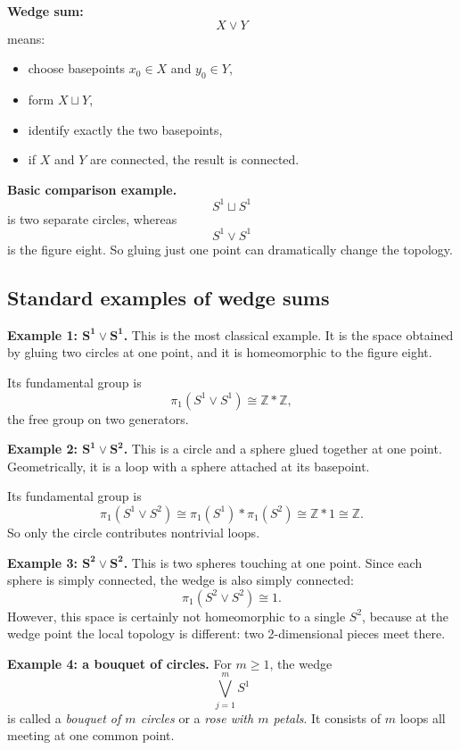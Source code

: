 \documentclass[12pt,a4paper]{article}
\theoremstyle{notespace}
\begin{document}
\medskip

\textbf{Wedge sum:}
\[
X\vee Y
\]
means:
\begin{itemize}
	\item choose basepoints \(x_0\in X\) and \(y_0\in Y\),
	\item form \(X\sqcup Y\),
	\item identify exactly the two basepoints,
	\item if \(X\) and \(Y\) are connected, the result is connected.
\end{itemize}

\medskip

\textbf{Basic comparison example.}
\[
S^1\sqcup S^1
\]
is two separate circles, whereas
\[
S^1\vee S^1
\]
is the figure eight. So gluing just one point can dramatically change the topology.

\bigskip

\subsection{Standard examples of wedge sums}

\textbf{Example 1: \(\boldsymbol{S^1\vee S^1}\).}
This is the most classical example. It is the space obtained by gluing two circles at one point, and it is homeomorphic to the figure eight.

Its fundamental group is
\[
\pi_1(S^1\vee S^1)\cong \mathbb Z * \mathbb Z,
\]
the free group on two generators.

\medskip

\textbf{Example 2: \(\boldsymbol{S^1\vee S^2}\).}
This is a circle and a sphere glued together at one point. Geometrically, it is a loop with a sphere attached at its basepoint.

Its fundamental group is
\[
\pi_1(S^1\vee S^2)\cong \pi_1(S^1)*\pi_1(S^2)\cong \mathbb Z*1\cong \mathbb Z.
\]
So only the circle contributes nontrivial loops.

\medskip

\textbf{Example 3: \(\boldsymbol{S^2\vee S^2}\).}
This is two spheres touching at one point. Since each sphere is simply connected, the wedge is also simply connected:
\[
\pi_1(S^2\vee S^2)\cong 1.
\]
However, this space is certainly not homeomorphic to a single \(S^2\), because at the wedge point the local topology is different: two 2-dimensional pieces meet there.

\medskip

\textbf{Example 4: a bouquet of circles.}
For \(m\geq 1\), the wedge
\[
\bigvee_{j=1}^m S^1
\]
is called a \emph{bouquet of \(m\) circles} or a \emph{rose with \(m\) petals}. It consists of \(m\) loops all meeting at one common point.
\end{document}
